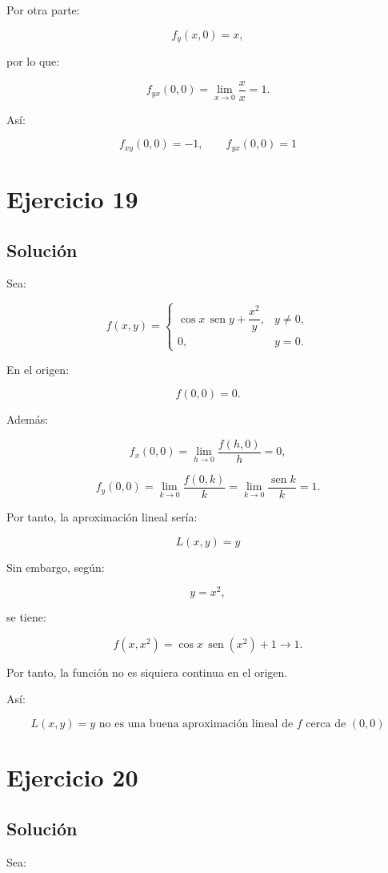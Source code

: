 \documentclass[11pt,a4paper]{article}
\newcommand{\sen}{\operatorname{sen}}
\begin{document}
Por otra parte:

\[
f_y(x,0)=x,
\]

por lo que:

\[
f_{yx}(0,0)
=
\lim_{x\to0}
\frac{x}{x}
=
1.
\]

Así:

\[
\boxed{
f_{xy}(0,0)=-1,
\qquad
f_{yx}(0,0)=1
}
\]

\section{Ejercicio 19}
\subsection{Solución}

Sea:

\[
f(x,y)
=
\begin{cases}
\cos x\,\sen y+\dfrac{x^2}{y},
&
y\neq0,\\[2mm]
0,
&
y=0.
\end{cases}
\]

En el origen:

\[
f(0,0)=0.
\]

Además:

\[
f_x(0,0)
=
\lim_{h\to0}
\frac{f(h,0)}{h}
=
0,
\]

\[
f_y(0,0)
=
\lim_{k\to0}
\frac{f(0,k)}{k}
=
\lim_{k\to0}
\frac{\sen k}{k}
=
1.
\]

Por tanto, la aproximación lineal sería:

\[
\boxed{
L(x,y)=y
}
\]

Sin embargo, según:

\[
y=x^2,
\]

se tiene:

\[
f(x,x^2)
=
\cos x\,\sen(x^2)+1
\longrightarrow
1.
\]

Por tanto, la función no es siquiera continua en el origen.

Así:

\[
\boxed{
L(x,y)=y\text{ no es una buena aproximación lineal de }f
\text{ cerca de }(0,0)
}
\]

\section{Ejercicio 20}
\subsection{Solución}

Sea:
\end{document}
